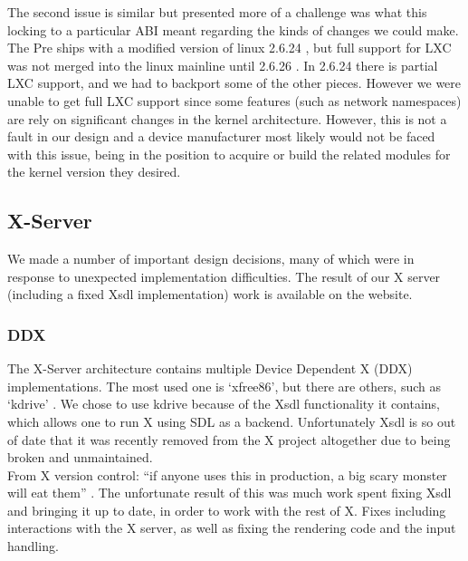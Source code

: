     The second issue is similar but presented more of a challenge was what this locking to a particular ABI meant regarding the kinds of changes we could make.  The Pre ships with a modified version of linux 2.6.24 \cite{pre_kernel}, but full support for LXC was not merged into the linux mainline until 2.6.26 \cite{lxc_kernel}.  In 2.6.24 there is partial LXC support, and we had to backport some of the other pieces.  However we were unable to get full LXC support since some features (such as network namespaces) are rely on significant changes in the kernel architecture.  However, this is not a fault in our design and a device manufacturer most likely would not be faced with this issue, being in the position to acquire or build the related modules for the kernel version they desired. \\


\subsection{X-Server}

We made a number of important design decisions, many of which were in response to unexpected implementation difficulties.   The result of our X server (including a fixed Xsdl implementation) work is available on the website\footnotemark[1]. 
\\

\subsubsection{DDX}
The X-Server architecture contains multiple Device Dependent X (DDX) implementations.  The most used one is `xfree86', but there are others, such as `kdrive' \cite{x_glossary}.  We chose to use kdrive because of the Xsdl functionality it contains, which allows one to run X using SDL as a backend.  Unfortunately Xsdl is so out of date that it was recently removed from the X project altogether due to being broken and unmaintained. \\

From X version control: ``if anyone uses this in production, a big scary monster will eat them'' \cite{x_quote}.  The unfortunate result of this was much work spent fixing Xsdl and bringing it up to date, in order to work with the rest of X.  Fixes including interactions with the X server, as well as fixing the rendering code and the input handling. \\

